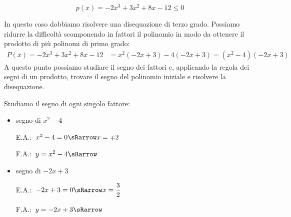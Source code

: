 \begin{esempio}
 \[p(x)=-2x^3+3x^2+8x-12 \le 0\]

In questo caso dobbiamo risolvere una disequazione di terzo grado.
Possiamo ridurre la difficoltà scomponendo in fattori il polinomio in modo da
ottenere il prodotto di più polinomi di primo grado:
\begin{align*}
P(x) = -2x^3+3x^2+8x-12 &= x^2(-2x+3)-4(-2x+3) = (x^2-4)(-2x+3)
\end{align*}
A questo punto possiamo studiare il segno dei fattori e, applicando la regola
dei segni di un prodotto, trovare il segno del polinomio iniziale e risolvere
la disequazione.

Studiamo il segno di ogni singolo fattore:
\begin{itemize}

 \item segno di \(x^2-4\)\\
 \begin{minipage}{.35\textwidth}
  E.A.:~\(x^2-4=0 \sRarrow x=\mp 2\)
 \end{minipage}
 \begin{minipage}{.25\textwidth}
  F.A.:~\(y=x^2-4 \sRarrow\)
 \end{minipage}
 \begin{minipage}{.38\textwidth}
  \begin{inaccessibleblock}
\end{inaccessibleblock}
 \end{minipage}

 \item  segno di \(-2x+3\)\\
 \begin{minipage}{.35\textwidth}
  E.A.:~\(-2x+3=0 \sRarrow x=\dfrac{3}{2}\)
  \vspace{1.8em}
 \end{minipage}
 \begin{minipage}{.25\textwidth}
  F.A.:~\(y=-2x+3 \sRarrow \)
  \vspace{1.8em}
 \end{minipage}
 \begin{minipage}{.38\textwidth}
  \begin{inaccessibleblock}
\end{inaccessibleblock}
 \end{minipage}


\end{itemize}
\end{esempio}
